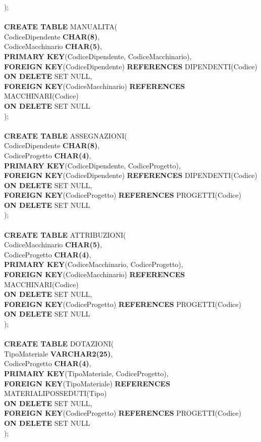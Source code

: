 \documentclass[a4paper,12pt,italian]{article}
\begin{document}
); \\ \\
\textbf{CREATE TABLE} MANUALITA( \\
CodiceDipendente \textbf{CHAR(8)}, \\
CodiceMacchinario \textbf{CHAR(5)}, \\
\textbf{PRIMARY KEY}(CodiceDipendente, CodiceMacchinario), \\
\textbf{FOREIGN KEY}(CodiceDipendente) \textbf{REFERENCES} DIPENDENTI(Codice) \\ \textbf{ON DELETE} SET NULL, \\
\textbf{FOREIGN KEY}(CodiceMacchinario) \textbf{REFERENCES} MACCHINARI(Codice) \\
\textbf{ON DELETE} SET NULL \\
); \\ \\
\textbf{CREATE TABLE} ASSEGNAZIONI( \\
CodiceDipendente \textbf{CHAR(8)}, \\
CodiceProgetto \textbf{CHAR(4)}, \\
\textbf{PRIMARY KEY}(CodiceDipendente, CodiceProgetto), \\
\textbf{FOREIGN KEY}(CodiceDipendente) \textbf{REFERENCES} DIPENDENTI(Codice) \\ \textbf{ON DELETE} SET NULL, \\
\textbf{FOREIGN KEY}(CodiceProgetto) \textbf{REFERENCES} PROGETTI(Codice) \\
\textbf{ON DELETE} SET NULL \\
); \\ \\
\textbf{CREATE TABLE} ATTRIBUZIONI( \\
CodiceMacchinario \textbf{CHAR(5)}, \\
CodiceProgetto \textbf{CHAR(4)}, \\
\textbf{PRIMARY KEY}(CodiceMacchinario, CodiceProgetto), \\
\textbf{FOREIGN KEY}(CodiceMacchinario) \textbf{REFERENCES} MACCHINARI(Codice) \\ \textbf{ON DELETE} SET NULL, \\
\textbf{FOREIGN KEY}(CodiceProgetto) \textbf{REFERENCES} PROGETTI(Codice) \\
\textbf{ON DELETE} SET NULL \\
); \\ \\
\textbf{CREATE TABLE} DOTAZIONI( \\
TipoMateriale \textbf{VARCHAR2(25)}, \\
CodiceProgetto \textbf{CHAR(4)}, \\
\textbf{PRIMARY KEY}(TipoMateriale, CodiceProgetto), \\
\textbf{FOREIGN KEY}(TipoMateriale) \textbf{REFERENCES} MATERIALIPOSSEDUTI(Tipo) \\ \textbf{ON DELETE} SET NULL, \\
\textbf{FOREIGN KEY}(CodiceProgetto) \textbf{REFERENCES} PROGETTI(Codice) \\
\textbf{ON DELETE} SET NULL \\
); \\ \\
\end{document}
